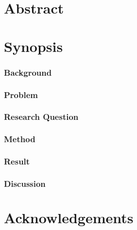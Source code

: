 \documentclass[12pt]{report}
\numberwithin{equation}{section}
\begin{document}




\chapter*{Abstract}
\thispagestyle{empty}


\chapter*{Synopsis}
\thispagestyle{empty}

\subsection*{Background}
\subsection*{Problem}
\subsection*{Research Question}
\subsection*{Method}
\subsection*{Result}
\subsection*{Discussion}

\chapter*{Acknowledgements}
\thispagestyle{empty}

\tableofcontents
\setcounter{page}{1}
\thispagestyle{plain}

\listoffigures
\thispagestyle{plain}
\end{document}
